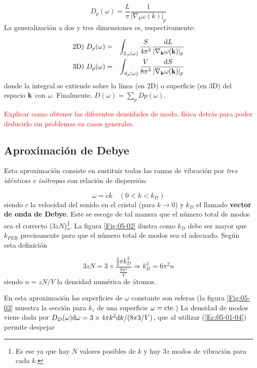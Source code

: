 \begin{equation}
	D_p (\omega)  = \frac{L}{\pi} \frac{1}{|\nabla_ k \omega (k)|_p }
\end{equation}
La generalización a dos y tres dimensiones es, respectivamente:

\begin{eqnarray}
	\text{2D}) \  D_p (\omega) &=& \int_{L_p (\omega)} \frac{S}{4\pi^2} \frac{\mathrm{d} L}{|\nabla_{\mathbf{k}} \omega(\mathbf{k})|_p} \\ 
	\text{3D}) \  D_p (\omega) &=& \int_{S_p (\omega)} \frac{V}{8\pi^3} \frac{\mathrm{d} S}{|\nabla_{\mathbf{k}} \omega(\mathbf{k})|_p} \label{Ec:05-01-04}
\end{eqnarray}
donde la integral se extiende sobre la línea (en 2D) o superficie (en 3D) del espacio $\mathbf{k}$ con $\omega$. Finalmente, $D(\omega)=\sum_p Dp (\omega)$.
 
 \begin{Anotacion}
 	\textcolor{red}{Explicar como obtener las diferentes densidades de modo, física detrás para poder deducirlo sin problemas en casos generales.}
 \end{Anotacion}
 
 
\subsection{Aproximación de Debye}    

Esta aproximación consiste en sustituir todas las ramas de vibración por \textit{tres idénticas e isótropas} con relación de dispersión:

\begin{equation}
	\omega = c k \quad (0<k<k_D)
\end{equation}
siendo $c$ la velocidad del sonido en el cristal (para $k\rightarrow 0$) y $k_D$ el llamado \textbf{vector de onda de Debye}. Este se escoge de tal manera que el número total de modos sea el correcto ($3zN$)\footnote{Es ese ya que hay $N$ valores posibles de $k$ y hay $3z$ modos de vibración para cada $k$.}. La figura \ref{Fig:05-02} ilustra como $k_D$ debe ser mayor que $k_{PZB}$ precisamente para que el número total de modos sea el adecuado. Según esta definición

\begin{equation}
	3zN = 3 \times \frac{\frac{4}{3} \pi k^3_D}{\frac{8 \pi^3}{V}} \Rightarrow k_D^3 = 6 \pi^2 n
\end{equation}
siendo $n=zN/V$ la densidad numérica de átomos. 

En esta aproximación las superficies de $\omega$ constante son esferas (la figura \ref{Fig:05-03} muestra la sección para $k_z$ de una superficie $\omega=\text{cte}.$) La densidad de modos viene dada por $D_D(\omega) \mathrm{d} \omega = 3 \times 4 \pi k^2 \mathrm{d} k / (8\pi3 /V)$, que al utilizar (\ref{Ec:05-01-04}) permite despejar 

